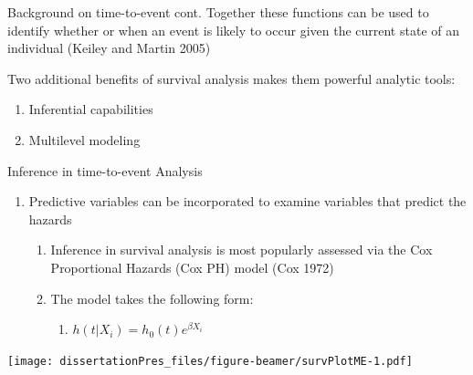 \documentclass[
  ignorenonframetext,
]{beamer}
\providecommand{\tightlist}{%
  \setlength{\itemsep}{0pt}\setlength{\parskip}{0pt}}
\begin{document}
\begin{frame}{Background on time-to-event cont.}
\label{background-on-time-to-event-cont.-1}
Together these functions can be used to identify whether or when an
event is likely to occur given the current state of an individual
(Keiley and Martin 2005)

Two additional benefits of survival analysis makes them powerful
analytic tools:

\begin{enumerate}
\item
  Inferential capabilities
\item
  Multilevel modeling
\end{enumerate}
\end{frame}

\begin{frame}{Inference in time-to-event Analysis}
\label{inference-in-time-to-event-analysis}
\begin{enumerate}
\item
  Predictive variables can be incorporated to examine variables that
  predict the hazards

  \begin{enumerate}
  \item
    Inference in survival analysis is most popularly assessed via the
    Cox Proportional Hazards (Cox PH) model (Cox 1972)
  \item
    The model takes the following form:

    \begin{enumerate}
    \tightlist
    \item
      \(h(t|X_i)=h_0(t)e^{\beta X_i}\)
    \end{enumerate}
  \end{enumerate}
\end{enumerate}

\texttt{[image: dissertationPres\_files/figure-beamer/survPlotME-1.pdf]}
\end{frame}
\end{document}
